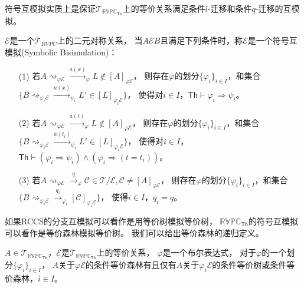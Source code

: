 符号互模拟实质上是保证$\mathcal{T}_{\mathbb{RVPC}_{\mathsf{Th}}}$上的等价关系满足条件$l$-迁移和条件$q$-迁移的互模拟。
\begin{definition}[符号互模拟]\label{def:rvpc_symbolic_bisimulation}
   $\mathcal{E}$是一个$\mathcal{T}_{RVPC}$上的二元对称关系，
当$A\mathcal{E}B$且满足下列条件时，称$\mathcal{E}$是一个符号互模拟(Symbolic Bisimulation)：
\begin{itemize}
   \item[(1)] {
      若$ A \rightsquigarrow_{\varphi \mathcal{E}}\stackrel{a(x)}{\rightarrow}_{\varphi} L\notin [A]_{\varphi \mathcal{E}}$，
      则存在$\varphi$的划分$\{\varphi_i\}_{i\in I}$，和集合$\{B\rightsquigarrow_{\varphi_i \mathcal{E}}\stackrel{a(x)}{\rightarrow}_{\psi_i} L'\in[L]_{\varphi_i\mathcal{E}}\}$，
      使得对$i\in I$，$\mathsf{Th}\vdash \varphi_i \Rightarrow \psi_i$。
   }
   \item[(2)] {
      若$A \rightsquigarrow_{\varphi \mathcal{E}}\stackrel{\bar{a}(t)}{\rightarrow}_{\varphi} L\notin [A]_{\varphi\mathcal{E}}$，
      则存在$\varphi$的划分$\{\varphi_i\}_{i\in I}$，和集合$\{B\rightsquigarrow_{\varphi_i\mathcal{E}}\stackrel{\bar{a}(t_i)}{\rightarrow}_{\psi_i} L'\in [L]_{\varphi_i\mathcal{E}}\}$，
      使得对$i\in I$，$\mathsf{Th}\vdash (\varphi_i \Rightarrow \psi_i)\wedge (\varphi_i \Rightarrow (t=t_i))$。
   }
   \item[(3)] {
      若$ A\rightsquigarrow_{\varphi\mathcal{E}} \stackrel{q}{\rightarrow}_{\varphi} \mathcal{C}\in \mathcal{T}/\mathcal{E}, \mathcal{C}\neq [A]_{\varphi \mathcal{E}}$，
      则存在$\varphi$的划分$\{\varphi_i\}_{i\in I}$，和集合$\{B\rightsquigarrow_{\varphi_i\mathcal{E}}\stackrel{q_i}{\rightarrow}_{\varphi_i} [\mathcal{C}]_{\varphi_i\mathcal{E}}\}$，
      使得$i\in I$，$q_i= q$。
   }
\end{itemize}
\end{definition}

如果RCCS的分支互模拟可以看作是用等价树模拟等价树，
$\mathbb{RVPC}_{\mathsf{Th}}$的符号互模拟可以看作是等价森林模拟等价树。
我们可以给出等价森林的递归定义。

\begin{definition}[条件等价森林]
   $A\in\mathcal{T}_{\mathbb{RVPC}_{\mathsf{Th}}}$，$\mathcal{E}$是$\mathcal{T}_{\mathbb{RVPC}_{\mathsf{Th}}}$上的等价关系，
   $\varphi$是一个布尔表达式，
   对于$\varphi$的一个划分$\{\varphi_i\}_{i\in I}$，
   $A$关于$\varphi\mathcal{E}$的条件等价森林有且仅有$A$关于$\varphi_i\mathcal{E}$的条件等价树或条件等价森林，$i\in I$。
\end{definition}

